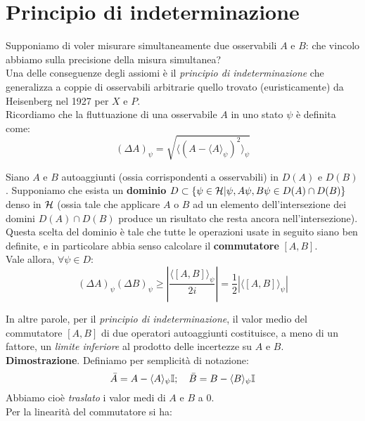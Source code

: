 \documentclass[../../FisicaTeorica.tex]{subfiles}
\begin{document}
\section{Principio di indeterminazione}
Supponiamo di voler misurare simultaneamente due osservabili $A$ e $B$: che vincolo abbiamo sulla precisione della misura simultanea?\\
Una delle conseguenze degli assiomi è il \textit{principio di indeterminazione} che generalizza a coppie di osservabili arbitrarie quello trovato (euristicamente) da Heisenberg nel 1927 per $X$ e $P$.\\
Ricordiamo che la fluttuazione di una osservabile $A$ in uno stato $\psi$ è definita come:
\begin{equation}
(\Delta A)_\psi = \sqrt{\langle(A-\langle A\rangle_\psi)^2\rangle_\psi}
\label{eqn:def_fluttuazione}
\end{equation}
\begin{thm}
\label{thm:uncertainty_principle}
Siano $A$ e $B$ autoaggiunti (ossia corrispondenti a osservabili) in $D(A)$ e $D(B)$. Supponiamo che esista un \textbf{dominio } $D \subset \{\psi \in \mathcal{H} | \psi, A\psi, B\psi \in D(A)\cap D(B)\}$ denso in $\mathcal{H}$ 
(ossia tale che applicare $A$ o $B$ ad un elemento dell'intersezione dei domini $D(A)\cap D(B)$ produce un risultato che resta ancora nell'intersezione). Questa scelta del dominio è tale che tutte le operazioni usate in seguito siano ben definite, e in particolare abbia senso calcolare il \textbf{commutatore} $[A,B]$.\\
Vale allora, $\forall \psi \in D$:
\[
(\Delta A)_\psi (\Delta B)_\psi \geq \left |\frac{\langle [A,B]\rangle_\psi}{2i} \right | = \frac{1}{2}\left|\langle [A,B]\rangle_\psi\right|
\]
\end{thm}
In altre parole, per il \textit{principio di indeterminazione}, il valor medio del commutatore $[A,B]$ di due operatori autoaggiunti costituisce, a meno di un fattore, un \textit{limite inferiore} al prodotto delle incertezze su $A$ e $B$.\\
\textbf{Dimostrazione}. Definiamo per semplicità di notazione:
\begin{equation}
\bar{A}=A-\langle A \rangle_\psi \mathbb{I}; \quad \bar{B}=B-\langle B \rangle_\psi \mathbb{I}
\label{eqn:AB_traslate}
\end{equation}
Abbiamo cioè \textit{traslato} i valor medi di $A$ e $B$ a $0$.\\
Per la linearità del commutatore si ha:
\end{document}
